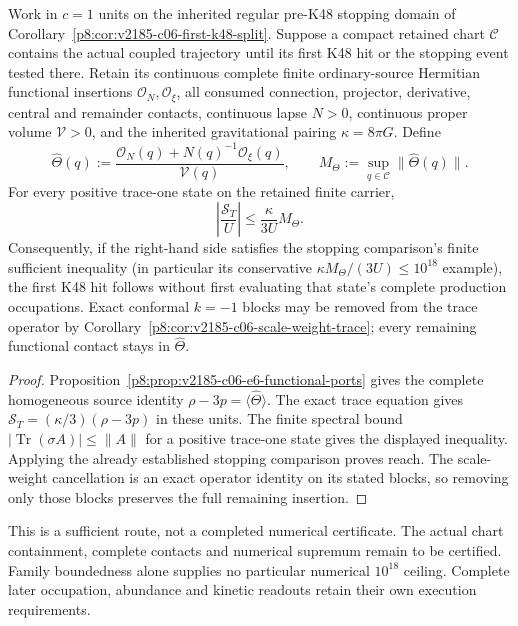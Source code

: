\documentclass[12pt,a4paper]{article}
\begin{document}
\begin{proposition}
\label{p8:prop:v2186-c06-finite-trace-norm-route}
Work in $c=1$ units on the inherited regular pre-K48 stopping domain of
Corollary~\ref{p8:cor:v2185-c06-first-k48-split}. Suppose a compact retained
chart $\mathscr C$ contains the actual coupled trajectory until its first
K48 hit or the stopping event tested there. Retain its continuous complete
finite ordinary-source Hermitian functional insertions
$\mathcal O_N,\mathcal O_\xi$, all consumed
connection, projector, derivative, central and remainder contacts, continuous
lapse $N>0$, continuous proper volume $\mathcal V>0$, and the inherited gravitational
pairing $\kappa=8\pi G$. Define
\[
 \widehat\Theta(q):=\frac{\mathcal O_N(q)+N(q)^{-1}\mathcal O_\xi(q)}
 {\mathcal V(q)},\qquad
 M_\Theta:=\sup_{q\in\mathscr C}\|\widehat\Theta(q)\|.
\]
For every positive trace-one state on the retained finite carrier,
\[
 \boxed{\left|\frac{\mathcal S_T}{U}\right|
 \le\frac{\kappa}{3U}M_\Theta.}
\]
Consequently, if the right-hand side satisfies the stopping comparison's
finite sufficient inequality (in particular its conservative
$\kappa M_\Theta/(3U)\le10^{18}$ example), the first K48 hit follows without
first evaluating that state's complete production occupations.
Exact conformal $k=-1$ blocks may be removed from the trace operator by
Corollary~\ref{p8:cor:v2185-c06-scale-weight-trace}; every remaining
functional contact stays in $\widehat\Theta$.
\end{proposition}
\begin{proof}
Proposition~\ref{p8:prop:v2185-c06-e6-functional-ports} gives the complete
homogeneous source identity
$\rho-3p=\langle\widehat\Theta\rangle$. The exact trace equation gives
$\mathcal S_T=(\kappa/3)(\rho-3p)$ in these units. The finite spectral
bound $|\operatorname{Tr}(\sigma A)|\le\|A\|$ for a positive trace-one
state gives the displayed inequality. Applying the already established
stopping comparison proves reach. The scale-weight cancellation is an exact
operator identity on its stated blocks, so removing only those blocks
preserves the full remaining insertion.
\end{proof}
This is a sufficient route, not a completed numerical certificate. The actual
chart containment, complete contacts and numerical supremum remain to be
certified. Family boundedness alone supplies no particular numerical
$10^{18}$ ceiling. Complete later occupation, abundance and kinetic readouts
retain their own execution requirements.
\end{document}
